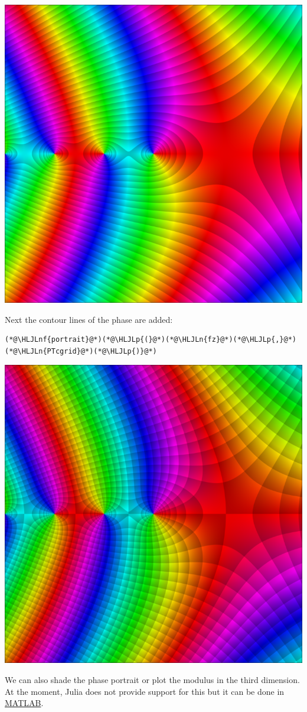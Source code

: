 \documentclass[12pt,a4paper]{article}
\newcommand{\HLJLn}[1]{#1}
\newcommand{\HLJLnf}[1]{\textcolor[RGB]{66,102,213}{#1}}
\newcommand{\HLJLp}[1]{#1}
\begin{document}
\includegraphics[width=\linewidth]{figures/Lecture1_19_1.png}

Next the contour lines of the phase are added:


\begin{lstlisting}
(*@\HLJLnf{portrait}@*)(*@\HLJLp{(}@*)(*@\HLJLn{fz}@*)(*@\HLJLp{,}@*) (*@\HLJLn{PTcgrid}@*)(*@\HLJLp{)}@*)
\end{lstlisting}

\includegraphics[width=\linewidth]{figures/Lecture1_20_1.png}

We can also shade the phase portrait or plot the modulus in the third dimension. At the moment, Julia does not provide support for this but it can be done in \href{https://uk.mathworks.com/matlabcentral/fileexchange/44375-phase-plots-of-complex-functions}{MATLAB}.
\end{document}
